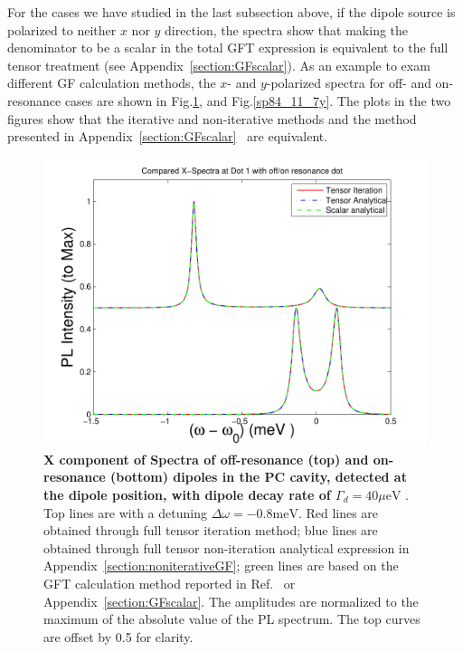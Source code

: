 For the cases we have studied in the last subsection above, if the dipole source is polarized to neither $x$ nor $y$ direction, the spectra show that making the denominator to be a scalar in the total GFT expression is equivalent to the full tensor treatment (see Appendix~\ref{section:GFscalar}). As an example to exam different GF calculation methods, the $x$- and $y$-polarized spectra for off- and on-resonance cases are shown in Fig.\ref{sp84_11_7x}, and Fig.\ref{sp84_11_7y}. The plots in the two figures show that the iterative and non-iterative methods and the method presented in Appendix~\ref{section:GFscalar}~\cite{Yao2009b} are equivalent.
\begin{figure}[H]
\centering
\begin{center}
\includegraphics[width=14cm]{./Figs/sp84_11_7x}
\end{center}
\caption[X component of Spectra of off-resonance and on-resonance dipoles.]{\textbf{  X component of Spectra of off-resonance (top) and on-resonance (bottom) dipoles in the PC cavity, detected at the dipole position, with dipole decay rate of $\Gamma_d = 40 \mu{\text {eV}}$ }. Top lines are with a detuning $\Delta \omega = -0.8 {\text {meV}}$. Red lines are obtained through full tensor iteration method; blue lines are obtained through full tensor non-iteration analytical expression in Appendix~\ref{section:noniterativeGF}; green lines are based on the GFT calculation method reported in Ref.~\cite{Yao2009b} or Appendix~\ref{section:GFscalar}. The amplitudes are normalized to the maximum of the absolute value of the PL spectrum. The top curves are offset by 0.5 for clarity.}
\label{sp84_11_7x}
\end{figure}

